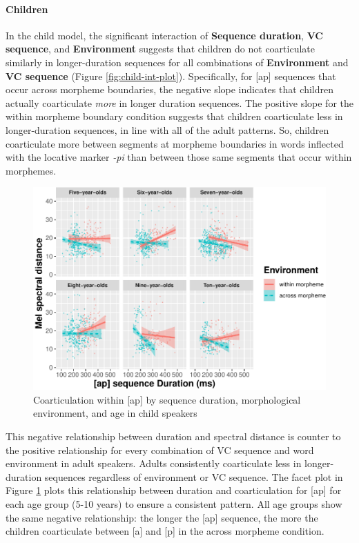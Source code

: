 \documentclass[
]{article}
\begin{document}
\hypertarget{children}{%
\paragraph{Children}\label{children}}

In the child model, the significant interaction of \textbf{Sequence duration}, \textbf{VC sequence}, and \textbf{Environment} suggests that children do not coarticulate similarly in longer-duration sequences for all combinations of \textbf{Environment} and \textbf{VC sequence} (Figure \ref{fig:child-int-plot}). Specifically, for {[}ap{]} sequences that occur across morpheme boundaries, the negative slope indicates that children actually coarticulate \emph{more} in longer duration sequences. The positive slope for the within morpheme boundary condition suggests that children coarticulate less in longer-duration sequences, in line with all of the adult patterns. So, children coarticulate more between segments at morpheme boundaries in words inflected with the locative marker \emph{-pi} than between those same segments that occur within morphemes.

\begin{figure}
\centering
\includegraphics{supp_analysis_files/figure-latex/child-facet-ap-1.pdf}
\caption{\label{fig:child-facet-ap}Coarticulation within {[}ap{]} by sequence duration, morphological environment, and age in child speakers}
\end{figure}

This negative relationship between duration and spectral distance is counter to the positive relationship for every combination of VC sequence and word environment in adult speakers. Adults consistently coarticulate less in longer-duration sequences regardless of environment or VC sequence. The facet plot in Figure \ref{fig:child-facet-ap} plots this relationship between duration and coarticulation for {[}ap{]} for each age group (5-10 years) to ensure a consistent pattern. All age groups show the same negative relationship: the longer the {[}ap{]} sequence, the more the children coarticulate between {[}a{]} and {[}p{]} in the across morpheme condition.
\end{document}
